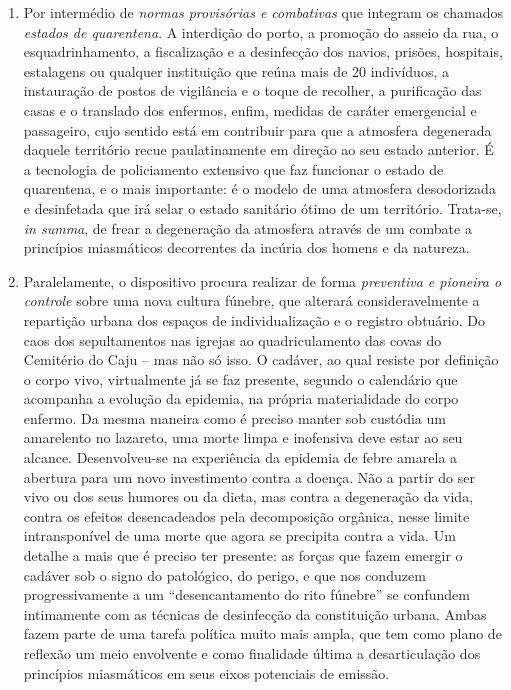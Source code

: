 \begin{enumerate}
\def\labelenumi{\arabic{enumi}.}
\item
  Por intermédio de \emph{normas provisórias e combativas} que integram
  os chamados \emph{estados de quarentena}. A interdição do porto, a
  promoção do asseio da rua, o esquadrinhamento, a fiscalização e a
  desinfecção dos navios, prisões, hospitais, estalagens ou qualquer
  instituição que reúna mais de 20 indivíduos, a instauração de postos
  de vigilância e o toque de recolher, a purificação das casas e o
  translado dos enfermos, enfim, medidas de caráter emergencial e
  passageiro, cujo sentido está em contribuir para que a atmosfera
  degenerada daquele território recue paulatinamente em direção ao seu
  estado anterior. É a tecnologia de policiamento extensivo que faz
  funcionar o estado de quarentena, e o mais importante: é o modelo de
  uma atmosfera desodorizada e desinfetada que irá selar o estado
  sanitário ótimo de um território. Trata-se, \emph{in summa}, de frear
  a degeneração da atmosfera através de um combate a princípios
  miasmáticos decorrentes da incúria dos homens e da natureza.
\item
  Paralelamente, o dispositivo procura realizar de forma
  \emph{preventiva e pioneira o controle} sobre uma nova cultura
  fúnebre, que alterará consideravelmente a repartição urbana dos
  espaços de individualização e o registro obtuário. Do caos dos
  sepultamentos nas igrejas ao quadriculamento das covas do Cemitério do
  Caju -- mas não só isso. O cadáver, ao qual resiste por definição o
  corpo vivo, virtualmente já se faz presente, segundo o calendário que
  acompanha a evolução da epidemia, na própria materialidade do corpo
  enfermo. Da mesma maneira como é preciso manter sob custódia um
  amarelento no lazareto, uma morte limpa e inofensiva deve estar ao seu
  alcance. Desenvolveu-se na experiência da epidemia de febre amarela a
  abertura para um novo investimento contra a doença. Não a partir do
  ser vivo ou dos seus humores ou da dieta, mas contra a degeneração da
  vida, contra os efeitos desencadeados pela decomposição orgânica,
  nesse limite intransponível de uma morte que agora se precipita contra
  a vida. Um detalhe a mais que é preciso ter presente: as forças que
  fazem emergir o cadáver sob o signo do patológico, do perigo, e que
  nos conduzem progressivamente a um ``desencantamento do rito fúnebre''
  se confundem intimamente com as técnicas de desinfecção da
  constituição urbana. Ambas fazem parte de uma tarefa política muito
  mais ampla, que tem como plano de reflexão um meio envolvente e como
  finalidade última a desarticulação dos princípios miasmáticos em seus
  eixos potenciais de emissão.
\end{enumerate}

